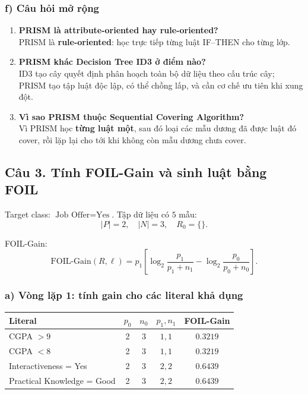 \subsubsection*{f) Câu hỏi mở rộng}
\begin{enumerate}
  \item \textbf{PRISM là attribute-oriented hay rule-oriented?}\\
  PRISM là \textbf{rule-oriented}: học trực tiếp từng luật IF--THEN cho từng lớp.
  \item \textbf{PRISM khác Decision Tree ID3 ở điểm nào?}\\
  ID3 tạo cây quyết định phân hoạch toàn bộ dữ liệu theo cấu trúc cây;
  PRISM tạo tập luật độc lập, có thể chồng lấp, và cần cơ chế ưu tiên khi xung đột.
  \item \textbf{Vì sao PRISM thuộc Sequential Covering Algorithm?}\\
  Vì PRISM học \textbf{từng luật một}, sau đó loại các mẫu dương đã được luật đó cover,
  rồi lặp lại cho tới khi không còn mẫu dương chưa cover.
\end{enumerate}

\subsection*{Câu 3. Tính FOIL-Gain và sinh luật bằng FOIL}

Target class: \(\text{Job Offer}=\text{Yes}\).
Tập dữ liệu có \(5\) mẫu:
\[
|P|=2,\quad |N|=3,\quad R_0=\{\}.
\]

FOIL-Gain:
\[
\text{FOIL-Gain}(R,\ell)=p_1\left[\log_2\frac{p_1}{p_1+n_1}-\log_2\frac{p_0}{p_0+n_0}\right].
\]

\subsubsection*{a) Vòng lặp 1: tính gain cho các literal khả dụng}

\begin{center}
\begin{tabular}{@{}lcccc@{}}
\toprule
Literal & \(p_0\) & \(n_0\) & \(p_1,n_1\) & FOIL-Gain \\
\midrule
CGPA \(>9\) & 2 & 3 & \(1,1\) & \(0.3219\) \\
CGPA \(<8\) & 2 & 3 & \(1,1\) & \(0.3219\) \\
Interactiveness = Yes & 2 & 3 & \(2,2\) & \(0.6439\) \\
Practical Knowledge = Good & 2 & 3 & \(2,2\) & \(0.6439\) \\
\bottomrule
\end{tabular}
\end{center}

